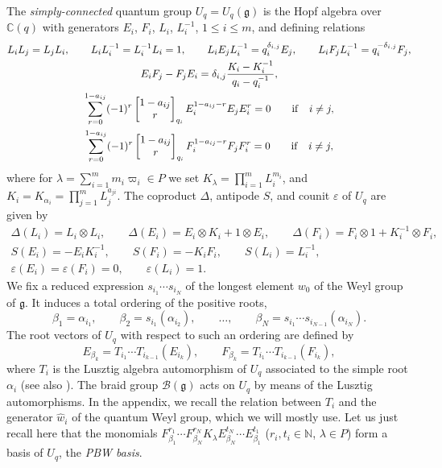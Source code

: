 \documentclass[pdftex]{sigma}
\numberwithin{equation}{section}
\theoremstyle{definition}
\newcommand{\mn}{\mathbb{N}}
\begin{document}
The {\it simply-connected} quantum group $U_q = U_q(\mathfrak{g})$ is the Hopf algebra over $\mathbb {C}(q)$ with generators $E_i$, $F_i$, $L_i$, $L_i^{-1}$, $1\leq i \leq m$, and defining relations
\begin{gather*}%
L_iL_j=L_jL_i , \qquad L_iL_i^{-1}=L_i^{-1}L_i=1,\qquad L_iE_jL_i^{-1}=q_i^{\delta_{i,j}}E_j ,\qquad L_iF_jL_i^{-1}=q_i^{-\delta_{i,j}}F_j, \\
E_iF_j-F_jE_i=\delta_{i,j}\frac{K_i-K_i^{-1}}{q_i-q_i^{-1}},\\
\sum_{r=0}^{1-a_{ij}} (-1)^r \left[\begin{matrix} 1-a_{ij} \\ r \end{matrix}\right]_{q_i} E_i^{1-a_{ij}-r}E_jE_i^{r} = 0 \qquad {\rm if}\quad i\ne j,\\
\sum_{r=0}^{1-a_{ij}} (-1)^r \left[\begin{matrix} 1-a_{ij} \\ r \end{matrix}\right]_{q_i} F_i^{1-a_{ij}-r}F_jF_i^{r} = 0 \qquad {\rm if}\quad i\ne j,
\end{gather*}
where for $ \lambda=\sum_{i=1}^m m_i \varpi_i \in P$ we set $ K_\lambda=\prod_{i=1}^m L_i^{m_i}$, and $ K_i=K_{\alpha_i}=\prod_{j=1}^m L_j^{a_{ji}}$.
The coproduct $\Delta$, antipode $S$, and counit $\varepsilon$ of $U_q$ are given by
\begin{gather*}
\Delta(L_i)=L_i\otimes L_i ,\qquad \Delta(E_i)=E_i\otimes K_i+1\otimes E_i ,\qquad \Delta(F_i)=F_i\otimes 1 + K_i^{-1}\otimes F_i, \\ S(E_i) = -E_iK_i^{-1},\qquad S(F_i) = -K_iF_i ,\qquad S(L_i) = L_i^{- 1},\\ \varepsilon(E_i) = \varepsilon(F_i)=0,\qquad \varepsilon(L_i)=1.
\end{gather*}
We fix a reduced expression $s_{i_1}\cdots s_{i_N}$ of the longest element $w_0$ of the Weyl group of $\mathfrak{g}$. It induces a total ordering of the positive roots,
\[\beta_1 = \alpha_{i_1},\qquad \beta_2 = s_{i_1}(\alpha_{i_2}), \qquad \dots, \qquad\beta_N = s_{i_1}\cdots s_{i_{N-1}}(\alpha_{i_N}).\]
The root vectors of $U_q$ with respect to such an ordering are defined by
\begin{equation}\label{rootvectdef}
E_{\beta_k} = T_{i_1}\cdots T_{i_{k-1}}(E_{i_k}) ,\qquad F_{\beta_k} = T_{i_1}\cdots T_{i_{k-1}}(F_{i_k}),
\end{equation}
where $T_i$ is the Lusztig algebra automorphism of $U_q$ associated to the simple root $\alpha_i$ \mbox{\cite{Lusztig2,Lusztig}} (see also \cite[Chapter~8]{CP}). The braid group $\mathcal{B}(\mathfrak{g})$ acts on $U_q$ by means of the Lusztig automorphisms. In the appendix, we recall the relation between $T_i$ and the generator $\hat{w}_i$ of the quantum Weyl group, which we will mostly use. Let us just recall here that the monomials $F_{\beta_1}^{r_1}\cdots F_{\beta_N}^{r_N}K_\lambda E_{\beta_N}^{t_N}\cdots E_{\beta_1}^{t_1}$ ($r_i,t_i\in \mn$, $\lambda\in P$) form a basis of $U_q$, the {\it PBW basis}.
\end{document}

